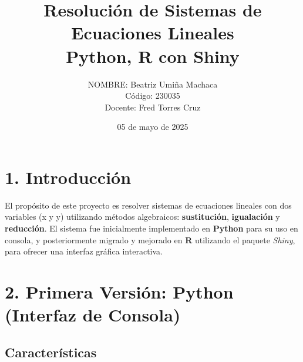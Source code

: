 \documentclass[a4paper,10pt]{article}
\begin{document}
\title{\textbf{  Resolución de Sistemas de Ecuaciones Lineales\\ Python, R con Shiny}}
\author{
  NOMBRE: Beatriz Umiña Machaca\\
  Código: 230035 \\
  Docente: Fred Torres Cruz
}
\date{05 de mayo de 2025}

\maketitle
\thispagestyle{fancy}  


\section*{1. Introducción}

El propósito de este proyecto es resolver sistemas de ecuaciones lineales con dos variables (x y y) utilizando métodos algebraicos: \textbf{sustitución}, \textbf{igualación} y \textbf{reducción}. El sistema fue inicialmente implementado en \textbf{Python} para su uso en consola, y posteriormente migrado y mejorado en \textbf{R} utilizando el paquete \textit{Shiny}, para ofrecer una interfaz gráfica interactiva.

\section*{2. Primera Versión: Python (Interfaz de Consola)}

\subsection*{Características}
\end{document}
